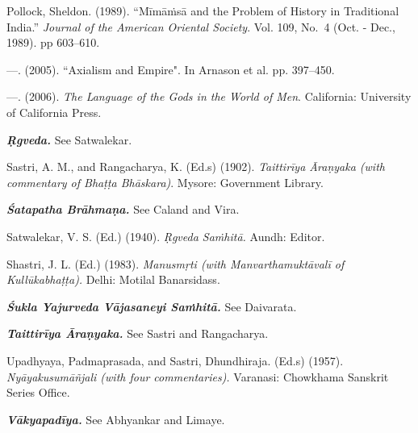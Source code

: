 \begin{thebibliography}{99}
  Pollock, Sheldon. (1989). “Mīmāṁsā and the Problem of History in Traditional India.” \textit{Journal of the American Oriental Society}. Vol. 109, No.~4 (Oct. - Dec., 1989). pp 603--610.

  —. (2005). ``Axialism and Empire". In Arnason et al. pp. 397--450.

  —. (2006). \textit{The Language of the Gods in the World of Men}. California: University of California Press.

  \textbf{\textit{Ṛgveda.}} See Satwalekar.

  Sastri, A. M., and Rangacharya, K. (Ed.s) (1902). \textit{Taittirīya Āraṇyaka (with commentary of Bhaṭṭa Bhāskara)}. Mysore: Government Library.

  \textbf{\textit{Śatapatha Brāhmaṇa.}} See Caland and Vira.

  Satwalekar, V. S. (Ed.) (1940). \textit{Ṛgveda Saṁhitā.} Aundh: Editor.

  Shastri, J. L. (Ed.) (1983). \textit{Manusmṛti (with Manvarthamuktāvalī of Kullūkabhaṭṭa).} Delhi: Motilal Banarsidass.

  \textbf{\textit{Śukla Yajurveda Vājasaneyi Saṁhitā.}} See Daivarata.

  \textbf{\textit{Taittirīya Āraṇyaka.}} See Sastri and Rangacharya.

  Upadhyaya, Padmaprasada, and Sastri, Dhundhiraja. (Ed.s) (1957). \textit{Nyāyakusumāñjali (with four commentaries).} Varanasi: Chowkhama Sanskrit Series Office.

  \textbf{\textit{Vākyapadīya.}} See Abhyankar and Limaye.

 \end{thebibliography}

\egroup



